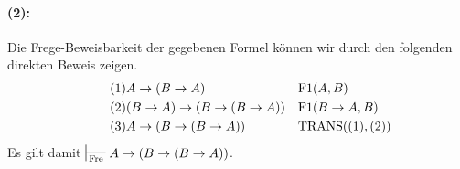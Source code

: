 \begin{multicols}{2}
      \paragraph{(2):}
      Die Frege-Beweisbarkeit der gegebenen Formel können wir durch den folgenden direkten Beweis zeigen.
      \begin{align}
        \tag{1}
          &A\to(B\to A)
          && \mathrm{F1}(A,B) \\
        \tag{2}
          &(B\to A) \to (B\to(B\to A))
          && \mathrm{F1}(B\to A,B) \\
        \tag{3}
          & A\to(B\to(B\to A))
          && \mathrm{TRANS}((1),(2))
      \end{align}
      Es gilt damit $\fregeProof A\to(B\to(B\to A))$. \qedbox

\end{multicols}
